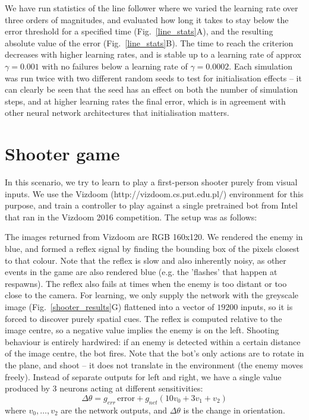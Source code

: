 \documentclass{aamas2018}
\begin{document}
We have run statistics of the line follower where we varied the
learning rate over three orders of magnitudes, and evaluated how long
it takes to stay below the error threshold for a specified time
(Fig.~\ref{line_stats}A), and the resulting absolute value of the
error (Fig.~\ref{line_stats}B). The time to reach the criterion
decreases with higher learning rates, and is stable up to a learning
rate of approx $\gamma = 0.001$ with no failures below a learning rate of
$\gamma = 0.0002$. Each simulation was run twice with two different random seeds to
test for initialisation effects -- it can clearly be seen that
the seed has an effect on both the number of simulation steps,
and at higher learning rates the final error, which is in agreement with other neural
network architectures that initialisation matters.




\section{Shooter game}
In this scenario, we try to learn to play a first-person shooter
purely from visual inputs. We use the Vizdoom
(http://vizdoom.cs.put.edu.pl/) environment for this purpose, and
train a controller to play against a single pretrained bot from Intel
that ran in the Vizdoom 2016 competition. The setup was as follows:

The images returned from Vizdoom are RGB 160x120. We rendered the
enemy in blue, and formed a reflex signal by finding the bounding box
of the pixels closest to that colour. Note that the reflex is slow and
also inherently noisy, as other events in the game are also rendered
blue (e.g. the 'flashes' that happen at respawns). The reflex also
fails at times when the enemy is too distant or too close to the
camera. For learning, we only supply the network with the greyscale
image (Fig.~\ref{shooter_results}G) flattened into a vector of $19200$
inputs, so it is forced to discover purely spatial cues. The reflex is
computed relative to the image centre, so a negative value implies the
enemy is on the left. Shooting behaviour is entirely hardwired: if an
enemy is detected within a certain distance of the image centre, the bot
fires. Note that the bot's only actions are to rotate in the plane,
and shoot -- it does not translate in the environment (the enemy moves freely). Instead of
separate outputs for left and right, we have a single value produced
by 3 neurons acting at different sensitivities:
\begin{equation}
\Delta \theta = g_{err}\, \mathrm{error} + g_{net} \left( 10 v_0 + 3 v_1 + v_2 \right)
\end{equation}
where $v_0, \ldots, v_2$ are the network outputs, and $\Delta \theta$
is the change in orientation.
\end{document}
